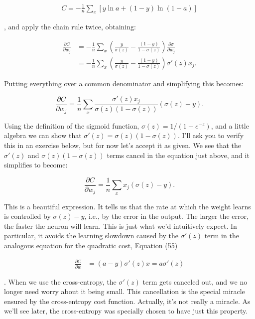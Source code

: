 \begin{align*}
C = -\frac{1}{n} \sum_x \left[y \ln a + (1-y ) \ln (1-a) \right] \nonumber
\end{align*}

\noindent, and apply the chain rule twice, obtaining:

\begin{align}
\frac{\partial C}{\partial w_j} &= -\frac{1}{n} \sum_x \left( \frac{y }{\sigma(z)} -\frac{(1-y)}{1-\sigma(z)} \right) \frac{\partial \sigma}{\partial w_j} \tag{58} \\ &= -\frac{1}{n} \sum_x \left( \frac{y}{\sigma(z)} -\frac{(1-y)}{1-\sigma(z)} \right)\sigma'(z) x_j. \tag{59}
\end{align}

\noindent Putting everything over a common denominator and simplifying this becomes:

\begin{equation}
\frac{\partial C}{\partial w_j} = \frac{1}{n} \sum_x \frac{\sigma'(z) x_j}{\sigma(z) (1-\sigma(z))} (\sigma(z)-y).
\tag{60}
\end{equation}

\noindent Using the definition of the sigmoid function, $\sigma(z) = 1/(1+e^{-z})$, and a little algebra we can show that $\sigma'(z) = \sigma(z)(1-\sigma(z))$. I'll ask you to verify this in an exercise below, but for now let's accept it as given. We see that the $\sigma'(z)$ and $\sigma(z)(1-\sigma(z))$ terms cancel in the equation just above, and it simplifies to become:

\begin{equation}
\frac{\partial C}{\partial w_j} = \frac{1}{n} \sum_x x_j(\sigma(z)-y).
\tag{61}
\end{equation}

\noindent This is a beautiful expression. It tells us that the rate at which the weight learns is controlled by $\sigma(z)-y$, i.e., by the error in the output. The larger the error, the faster the neuron will learn. This is just what we'd intuitively expect. In particular, it avoids the learning slowdown caused by the $\sigma'(z)$ term in the analogous equation for the quadratic cost, Equation (55)

\begin{align*}
\frac{\partial C}{\partial w} &= (a-y)\sigma'(z) x = a \sigma'(z) \nonumber
\end{align*}

\noindent. When we use the cross-entropy, the $\sigma'(z)$ term gets canceled out, and we no longer need worry about it being small. This cancellation is the special miracle ensured by the cross-entropy cost function. Actually, it's not really a miracle. As we'll see later, the cross-entropy was specially chosen to have just this property.


